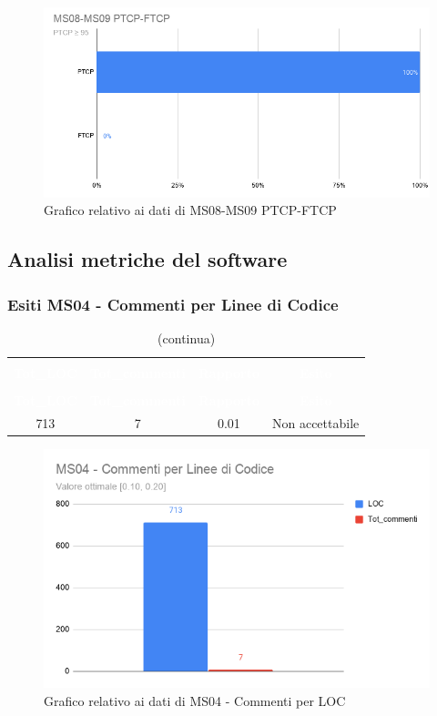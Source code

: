 \begin{figure}[H]
\centering
\includegraphics[scale=0.5]{./img/MS08-MS09.png}
\caption{Grafico relativo ai dati di MS08-MS09 PTCP-FTCP}
\end{figure}

\pagebreak
\subsection{Analisi metriche del software}
\subsubsection{Esiti MS04 - Commenti per Linee di Codice}
\begin{longtable}{c c c c}
\rowcolor{white}\caption{Esiti MS04} \\
	\rowcolor{redafk}
	\textcolor{white}{\textbf{Tot\_LOC}} &
	\textcolor{white}{\textbf{Tot\_commenti}} &
\textcolor{white}{\textbf{Rapporto}} &
\textcolor{white}{\textbf{Esito}} \\
	\endfirsthead
		\rowcolor{white}\caption[]{(continua)} \\
		\rowcolor{redafk}
		\textcolor{white}{\textbf{Tot\_LOC}} &
\textcolor{white}{\textbf{Tot\_commenti}} &
\textcolor{white}{\textbf{Rapporto}} & 
\textcolor{white}{\textbf{Esito}} \\
	\endhead
	713 & 7 & 0.01 & Non accettabile\\	
\end{longtable}

\begin{figure}[H]
\centering
\includegraphics[scale=0.40]{./img/MS04.png}
\caption{Grafico relativo ai dati di MS04 - Commenti per LOC}
\end{figure}

